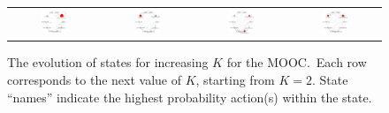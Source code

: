 {\begin{landscape}
\begin{figure}
\begin{tabular}{cccc}
    \includegraphics[width=0.30\textwidth]{figures/text-4state/state0.png}
    &
    \includegraphics[width=0.30\textwidth]{figures/text-4state/state1.png}
    &
    \includegraphics[width=0.30\textwidth]{figures/text-4state/state2.png}
    &
    \includegraphics[width=0.30\textwidth]{figures/text-4state/state3.png}
  \end{tabular}
  \caption{The evolution of states for increasing $K$ for the
  \protect\textretrieval{} MOOC.\ Each row corresponds to the next value of
  $K$, starting from $K=2$. State ``names'' indicate the highest
  probability action(s) within the state.} %
  \label{fig:text-state-evolution}
\end{figure}
\end{landscape}
}

